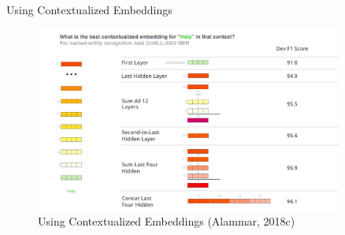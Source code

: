 \documentclass[10pt]{beamer}
\begin{document}
\begin{frame}{Using Contextualized Embeddings}

\begin{figure}[h]
\centering
\includegraphics[width=0.9\textwidth]{fig/bert-feature-extraction-contextualized-embeddings.png}
\caption{Using Contextualized Embeddings (Alammar, 2018c)}
\end{figure}

\end{frame}
\end{document}
